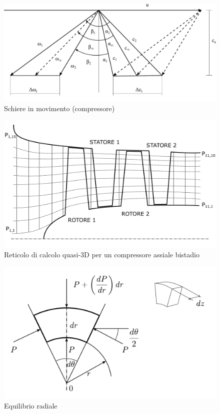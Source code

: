 \begin{figure}
\centering
  \includegraphics[width=\textwidth]{fig/SchiereCompr.pdf}
\caption{Schiere in movimento (compressore)}
\label{fig:SchiereCompr}
\end{figure}

\begin{figure}
\centering
  \includegraphics[width=\textwidth]{fig/ReticoloComp.pdf}
\caption{Reticolo di calcolo quasi-3D per un compressore assiale bistadio}
\label{fig:ReticoloComp}
\end{figure}

\begin{figure}
\centering
  \includegraphics[width=\textwidth]{fig/concio.pdf}
\caption{Equilibrio radiale}
\label{fig:concio}
\end{figure}

